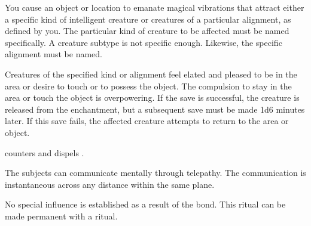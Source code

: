 \spellrng{\rngclose}
\begin{spelleffect}
You cause an object or location to emanate magical vibrations that attract either a specific kind of intelligent creature or creatures of a particular alignment, as defined by you. The particular kind of creature to be affected must be named specifically. A creature subtype is not specific enough. Likewise, the specific alignment must be named.
\par Creatures of the specified kind or alignment feel elated and pleased to be in the area or desire to touch or to possess the object. The compulsion to stay in the area or touch the object is overpowering. If the save is successful, the creature is released from the enchantment, but a subsequent save must be made 1d6 minutes later. If this save fails, the affected creature attempts to return to the area or object.
\end{spelleffect}
\begin{spellnotes}
 counters and dispels .
\end{spellnotes}

\spellrng{\rngclose}
\begin{spelleffect}
  The subjects can communicate mentally through telepathy. The communication is instantaneous across any distance within the same plane.
\end{spelleffect}
\begin{spellnotes}
  No special influence is established as a result of the bond. This ritual can be made permanent with a  ritual.
\end{spellnotes}

